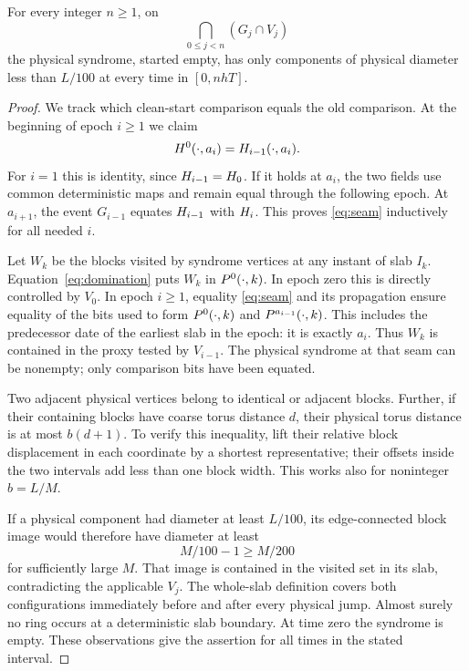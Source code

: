 \begin{lemma}\label{lem:iteration}
For every integer \(n\ge1\), on
\[
 \bigcap_{0\le j<n}(G_j\cap V_j)
\]
the physical syndrome, started empty, has only components of physical
diameter less than \(L/100\) at every time in \([0,nhT]\).
\end{lemma}
\begin{proof}
We track which clean-start comparison equals the old comparison.
At the beginning of epoch \(i\ge1\) we claim
\begin{equation}\label{eq:seam}
 H^0(\cdot,a_i)=H_{i-1}(\cdot,a_i).
\end{equation}
For \(i=1\) this is identity, since \(H_{i-1}=H_0\).
If it holds at \(a_i\), the two fields use common deterministic
maps and remain equal through the following epoch. At \(a_{i+1}\),
the event \(G_{i-1}\) equates \(H_{i-1}\) with \(H_i\).
This proves \eqref{eq:seam} inductively for all needed \(i\).

Let \(W_k\) be the blocks visited by syndrome vertices at any instant
of slab \(I_k\). Equation~\eqref{eq:domination} puts \(W_k\) in
\(P^0(\cdot,k)\). In epoch zero this is directly controlled by
\(V_0\). In epoch \(i\ge1\), equality
\eqref{eq:seam} and its propagation ensure equality of the bits
used to form \(P^0(\cdot,k)\) and
\(P^{a_{i-1}}(\cdot,k)\). This includes the predecessor date of
the earliest slab in the epoch: it is exactly \(a_i\).
Thus \(W_k\) is contained in the proxy tested by \(V_{i-1}\).
The physical syndrome at that seam can be nonempty; only comparison
bits have been equated.

Two adjacent physical vertices belong to identical or adjacent
blocks. Further, if their containing blocks have coarse torus
distance \(d\), their physical torus distance is at most \(b(d+1)\).
To verify this inequality, lift their relative block displacement
in each coordinate by a shortest representative; their offsets
inside the two intervals add less than one block width. This works
also for noninteger \(b=L/M\).

If a physical component had diameter at least \(L/100\), its
edge-connected block image would therefore have diameter at least
\[
 M/100-1\ge M/200
\]
for sufficiently large \(M\). That image is contained in the
visited set in its slab, contradicting the applicable \(V_j\).
The whole-slab definition covers both configurations immediately
before and after every physical jump. Almost surely no ring
occurs at a deterministic slab boundary. At time zero the syndrome
is empty. These observations give the assertion for all times in
the stated interval.
\end{proof}

